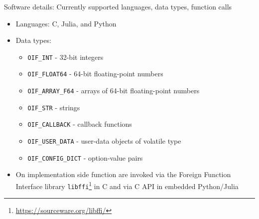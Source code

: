 \documentclass[
  10pt,
  aspectratio=169,
  english,
]{beamer}
\begin{document}
\begin{frame}{Software details: Currently supported languages, data types, function calls}
  \begin{itemize}
    \item Languages: C, Julia, and Python
    \item Data types:
          \begin{itemize}
            \item \texttt{OIF\_INT} - 32-bit integers
            \item \texttt{OIF\_FLOAT64} - 64-bit floating-point numbers
            \item \texttt{OIF\_ARRAY\_F64} - arrays of 64-bit floating-point numbers
            \item \texttt{OIF\_STR} - strings
            \item \texttt{OIF\_CALLBACK} - callback functions
            \item \texttt{OIF\_USER\_DATA} - user-data objects of volatile type
            \item \texttt{OIF\_CONFIG\_DICT} - option-value pairs
          \end{itemize}
    \item On implementation side function are invoked via
          the Foreign Function Interface library \texttt{libffi}\footnote{\url{https://sourceware.org/libffi/}}
          in C and via C API in embedded Python/Julia
  \end{itemize}
\end{frame}
\end{document}
